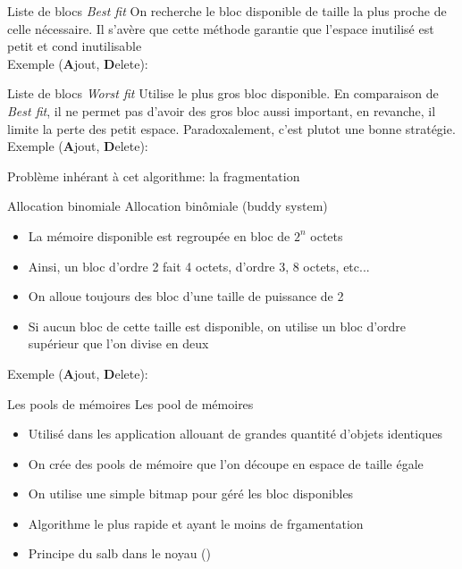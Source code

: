 \begin{frame}{Liste de blocs}
  \emph{Best fit}  On recherche le  bloc disponible de taille  la plus
  proche de  celle nécessaire.  Il s'avère que  cette méthode garantie
  que l'espace inutilisé est petit et cond inutilisable
  \\
  Exemple (\textbf{A}jout, \textbf{D}elete):
  \begin{center}
  \end{center}
\end{frame}

\begin{frame}{Liste de blocs}
  \emph{Worst  fit}   Utilise  le   plus  gros  bloc   disponible.  En
  comparaison de  \emph{Best fit}, il  ne permet pas d'avoir  des gros
  bloc  aussi important,  en revanche,  il limite  la perte  des petit
  espace.  Paradoxalement, c'est plutot une bonne stratégie.
  \\
  Exemple (\textbf{A}jout, \textbf{D}elete):
  \begin{center}
  \end{center}
   Problème inhérant à cet algorithme: la fragmentation
\end{frame}

\begin{frame}[fragile=singleslide]{Allocation binomiale}
  Allocation binômiale (buddy system)
  \begin{itemize}
  \item La mémoire disponible est regroupée en bloc de $2^n$ octets
  \item Ainsi, un  bloc d'ordre 2 fait 4 octets,  d'ordre 3, 8 octets,
    etc...
  \item On alloue toujours des bloc d'une taille de puissance de 2
  \item Si  aucun bloc de cette  taille est disponible,  on utilise un
    bloc d'ordre supérieur que l'on divise en deux
  \end{itemize}
  Exemple (\textbf{A}jout, \textbf{D}elete):
  \begin{center}
  \end{center}
\end{frame}

\begin{frame}[fragile=singleslide]{Les pools de mémoires}
  Les pool de mémoires
  \begin{itemize}
  \item  Utilisé dans  les  application allouant  de grandes  quantité
    d'objets identiques
  \item On  crée des pools  de mémoire que  l'on découpe en  espace de
    taille égale
  \item On utilise une simple bitmap pour géré les bloc disponibles
  \item Algorithme le plus rapide et ayant le moins de frgamentation
  \item Principe du salb dans le noyau ()
  \end{itemize}
\end{frame}

